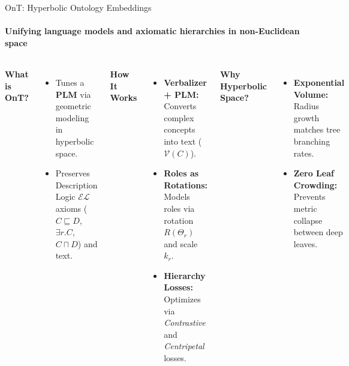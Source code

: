\documentclass[aspectratio=169, 11pt]{beamer}
\begin{document}
\begin{frame}{OnT: Hyperbolic Ontology Embeddings}
\framesubtitle{Unifying language models and axiomatic hierarchies in non-Euclidean space}

\vspace{-0.35cm}
\begin{columns}[T]
    \scriptsize
    \textbf{What is OnT?}
    \begin{itemize}\itemsep0.05em
        \item Tunes a \textbf{PLM} via geometric modeling in hyperbolic space.
        \item Preserves Description Logic $\mathcal{EL}$ axioms ($C \sqsubseteq D$, $\exists r.C$, $C \sqcap D$) and text.
    \end{itemize}

    \vspace{0.08cm}
    \textbf{How It Works}
    \begin{itemize}\itemsep0.05em
        \item \textbf{Verbalizer + PLM:} Converts complex concepts into text ($\mathcal{V}(C)$).
        \item \textbf{Roles as Rotations:} Models roles via rotation $R(\Theta_r)$ and scale $k_r$.
        \item \textbf{Hierarchy Losses:} Optimizes via \textit{Contrastive} and \textit{Centripetal} losses.
    \end{itemize}

    \vspace{0.08cm}
    \textbf{Why Hyperbolic Space?}
    \begin{itemize}\itemsep0.05em
        \item \textbf{Exponential Volume:} Radius growth matches tree branching rates.
        \item \textbf{Zero Leaf Crowding:} Prevents metric collapse between deep leaves.
    \end{itemize}

    \centering
    \vspace{0.15cm}
\end{columns}
\end{frame}
\end{document}
